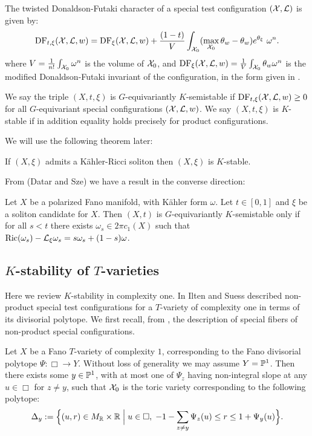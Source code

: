 \begin{definition}
The twisted Donaldson-Futaki character of a special test configuration \(({\mathcal{X}}, \mathcal{L}) \) is given by:
\[
\mathop{\rm DF}\nolimits_{t,\xi}({\mathcal{X}},\mathcal{L},w) = \mathop{\rm DF}\nolimits_{\xi}({\mathcal{X}},\mathcal{L},w) + \frac{(1-t)}{V} \int_{{\mathcal{X}}_0} ( \max_{{\mathcal{X}}_0} \theta_w - \theta_w)e^{\theta_\xi} \ \omega^n . 
\]
where \(V = \frac{1}{n!} \int_{{\mathcal{X}}_0} \omega^n\) is the volume of \({\mathcal{X}}_0\), and \(\mathop{\rm DF}\nolimits_\xi({\mathcal{X}},\mathcal{L},w) = \frac{1}{V} \int_{{\mathcal{X}}_0} \theta_w \omega^n\) is the modified Donaldson-Futaki invariant of the configuration, in the form given in \cite[Lemma 3.4]{berman2014complex}.
\end{definition}
\begin{definition}
We say the triple  \((X,t,\xi)\) is \(G\)-equivariantly \(K\)-semistable if \( \mathop{\rm DF}\nolimits_{t,\xi}({\mathcal{X}},\mathcal{L},w) \ge 0\) for all \(G\)-equivariant special configurations \(({\mathcal{X}},\mathcal{L},w)\). We say \((X,t,\xi)\) is \(K\)-stable if in addition equality holds precisely for product configurations. 
\end{definition}
We will use the following theorem later:
\begin{theorem} \label{thm:BWN}
If \((X,\xi)\) admits a K\"ahler-Ricci soliton then \((X,\xi)\) is \(K\)-stable.
\end{theorem}
From (Datar and Sze) we have a result in the converse direction:
\begin{theorem} \label{thm:DS}
Let \(X\) be a polarized Fano manifold, with K\"ahler form \(\omega\). Let \(t \in [0,1]\) and \(\xi\) be a soliton candidate for \(X\). Then \((X,t)\) is \(G\)-equivariantly \(K\)-semistable only if for all \(s <t\)  there exists \(\omega_s \in 2 \pi c_1(X)\) such that \(\mathop{\rm Ric}\nolimits(\omega_s) - \mathcal{L}_\xi \omega_s = s \omega_s + (1-s) \omega\).
\end{theorem}
\subsection{$K$-stability of $T$-varieties} \label{subsec:IS}
Here we review \(K\)-stability in complexity one. In \cite{ilten2015} Ilten and Suess described non-product special test configurations for a \(T\)-variety of complexity one in terms of its divisorial polytope. We first recall, from \cite{ilten2015}, the description of special fibers of non-product special configurations.

Let \(X\) be a Fano \(T\)-variety of complexity \(1\), corresponding to the Fano divisorial polytope \(\Psi : \Box \to Y\). Without loss of generality we may assume \(Y = \mathbb{P}^1\). Then there exists some \(y \in \mathbb{P}^1\), with at most one of \(\Psi_z\) having non-integral slope at any \(u \in \Box\) for \(z \neq y\), such that \({\mathcal{X}}_0\) is the toric variety corresponding to the following polytope:
\begin{equation*}
\Delta_y := \Big\{(u,r) \in M_{\mathbb{R}} \times \mathbb{R} \; \Big| \; u \in \Box,\; -1-\sum_{z \neq y} \Psi_z(u) \leq r \leq 1+\Psi_y(u)\Big\}.\label{eq:special-fibre}
\end{equation*}

